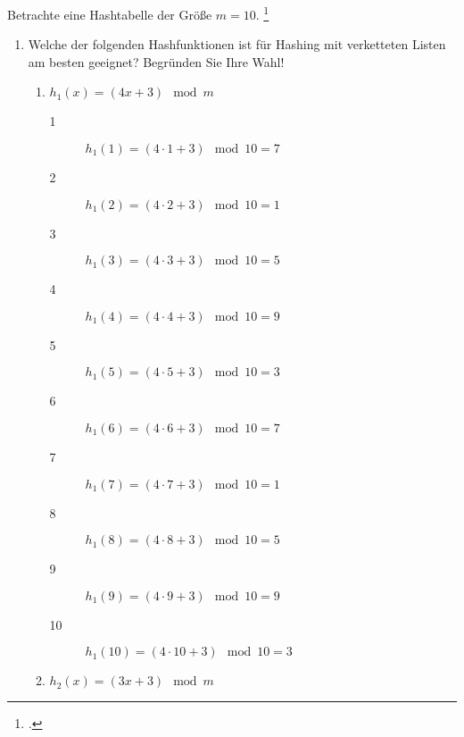 \documentclass{bschlangaul-aufgabe}
\begin{document}

Betrachte eine Hashtabelle der Größe $m = 10$.
\footcite[Seite 7]{examen:66115:2016:03}

\begin{enumerate}


\item Welche der folgenden Hashfunktionen ist für Hashing mit
verketteten Listen am besten geeignet?
Begründen Sie Ihre Wahl!

\begin{enumerate}
\item $h_1(x) = (4x + 3) \mod m$

\begin{bAntwort}
\begin{description}
\item[1] $h_1(1) = (4 \cdot 1 + 3) \mod 10 = 7$
\item[2] $h_1(2) = (4 \cdot 2 + 3) \mod 10 = 1$
\item[3] $h_1(3) = (4 \cdot 3 + 3) \mod 10 = 5$
\item[4] $h_1(4) = (4 \cdot 4 + 3) \mod 10 = 9$
\item[5] $h_1(5) = (4 \cdot 5 + 3) \mod 10 = 3$
\item[6] $h_1(6) = (4 \cdot 6 + 3) \mod 10 = 7$
\item[7] $h_1(7) = (4 \cdot 7 + 3) \mod 10 = 1$
\item[8] $h_1(8) = (4 \cdot 8 + 3) \mod 10 = 5$
\item[9] $h_1(9) = (4 \cdot 9 + 3) \mod 10 = 9$
\item[10] $h_1(10) = (4 \cdot 10 + 3) \mod 10 = 3$
\end{description}
\end{bAntwort}

\item $h_2(x) = (3x + 3) \mod m$


\end{enumerate}
\end{enumerate}
\end{document}
